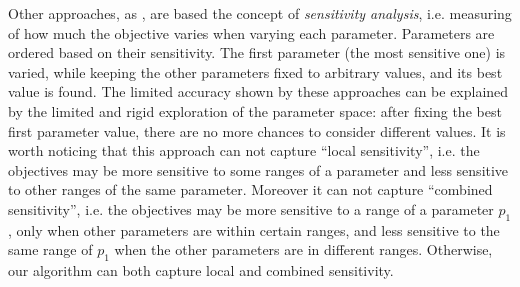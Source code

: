 Other approaches, as \cite{fornaciari_codes01,palesi_iwsoc02}, are based the concept of \emph{sensitivity analysis}, i.e. measuring of how much the objective varies when varying each parameter.
Parameters are ordered based on their sensitivity. The first parameter (the most sensitive one) is varied, while keeping the other parameters fixed to arbitrary values, and its best value is found. The limited accuracy shown by these approaches can be explained by the limited and rigid exploration of the parameter
space: after fixing the best first parameter value, there are no more chances to consider different values. It is worth noticing that this approach can not capture
``local sensitivity'', i.e. the objectives may be more sensitive to some
ranges of a parameter and less sensitive to other ranges of the same
parameter. Moreover it can not capture ``combined sensitivity'', i.e. the objectives may be
more sensitive to a range of a parameter $p_{1}$, only when other
parameters are within certain ranges, and less sensitive to the same
range of $p_{1}$ when the other parameters are in different ranges. Otherwise, our algorithm can both capture local and combined sensitivity.

